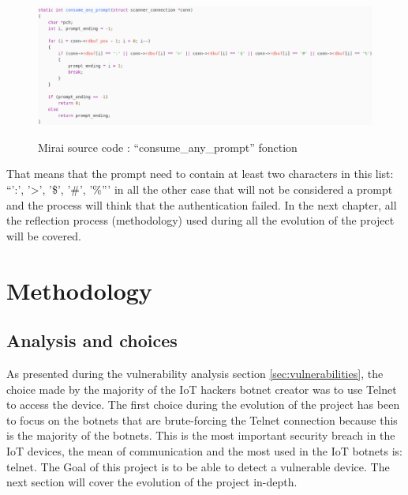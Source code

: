 \documentclass{report}
\begin{document}
\begin{figure}
  \caption{Mirai source code : ``consume\_any\_prompt'' fonction}
 \centering
 \includegraphics[width=1.2\textwidth]{./img/mirai-prompt}
 \label{fig:mirai-prompt}
\end{figure}
That means that the prompt need to contain at least two characters in this list: ``':', '>', '\$', '\#', '\%''' in all the other case that will not be considered a prompt and the process will think that the authentication failed.\newline
In the next chapter, all the reflection process (methodology) used during all the evolution of the project will be covered.

\chapter{Methodology}
\section{Analysis and choices}
As presented during the vulnerability analysis section \ref{sec:vulnerabilities}, the choice made by the majority of the IoT hackers botnet creator was to use Telnet to access the device. \newline
The first choice during the evolution of the project has been to focus on the botnets that are brute-forcing the Telnet connection because this is the majority of the botnets.
This is the most important security breach in the IoT devices, the mean of communication and the most used in the IoT botnets is: telnet. The Goal of this project is to be able to detect a vulnerable device.\newline
The next section will cover the evolution of the project in-depth.
\end{document}
